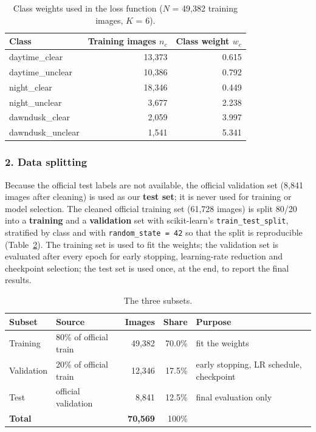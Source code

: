 \documentclass[12pt,letterpaper]{article}
\begin{document}
\begin{table}[htbp]
\centering\small
\caption{Class weights used in the loss function ($N$ = 49{,}382 training images, $K$ = 6).}
\label{tab:weights}
\begin{tabular}{lrr}
\toprule
Class & Training images $n_c$ & Class weight $w_c$ \\
\midrule
daytime\_clear    & 13{,}373 & 0.615 \\
daytime\_unclear  & 10{,}386 & 0.792 \\
night\_clear      & 18{,}346 & 0.449 \\
night\_unclear    &  3{,}677 & 2.238 \\
dawndusk\_clear   &  2{,}059 & 3.997 \\
dawndusk\_unclear &  1{,}541 & 5.341 \\
\bottomrule
\end{tabular}
\end{table}

\subsubsection{2. Data splitting}
Because the official test labels are not available, the official validation set (8{,}841 images after cleaning) is
used as our \textbf{test set}; it is never used for training or model selection. The cleaned official training set
(61{,}728 images) is split 80/20 into a \textbf{training} and a \textbf{validation} set with scikit-learn's
\texttt{train\_test\_split}, stratified by class and with \texttt{random\_state = 42} so that the split is
reproducible (Table~\ref{tab:split}). The training set is used to fit the weights; the validation set is evaluated
after every epoch for early stopping, learning-rate reduction and checkpoint selection; the test set is used once,
at the end, to report the final results.

\begin{table}[htbp]
\centering\small
\caption{The three subsets.}
\label{tab:split}
\begin{tabular}{llrrl}
\toprule
Subset & Source & Images & Share & Purpose \\
\midrule
Training   & 80\% of official train & 49{,}382 & 70.0\% & fit the weights \\
Validation & 20\% of official train & 12{,}346 & 17.5\% & early stopping, LR schedule, checkpoint \\
Test       & official validation    & 8{,}841  & 12.5\% & final evaluation only \\
\midrule
\textbf{Total} & & \textbf{70{,}569} & 100\% & \\
\bottomrule
\end{tabular}
\end{table}
\end{document}
